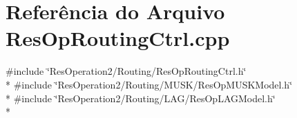 \section{Referência do Arquivo Res\+Op\+Routing\+Ctrl.\+cpp}
\label{_res_op_routing_ctrl_8cpp}
{\ttfamily \#include \char`\"{}Res\+Operation2/\+Routing/\+Res\+Op\+Routing\+Ctrl.\+h\char`\"{}}\\*
{\ttfamily \#include \char`\"{}Res\+Operation2/\+Routing/\+M\+U\+S\+K/\+Res\+Op\+M\+U\+S\+K\+Model.\+h\char`\"{}}\\*
{\ttfamily \#include \char`\"{}Res\+Operation2/\+Routing/\+L\+A\+G/\+Res\+Op\+L\+A\+G\+Model.\+h\char`\"{}}\\*
